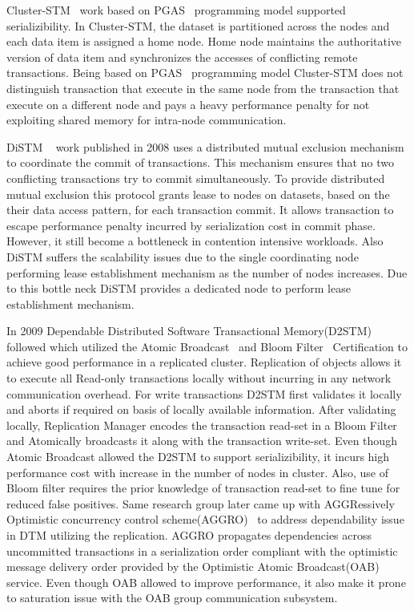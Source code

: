 \documentclass[12pt,english]{report}
\begin{document}
Cluster-STM~\cite{Bocchino:2008:STM:1345206.1345242} work based on PGAS~\cite{PGAS:Programmin:Model} programming model supported serializibility. In Cluster-STM, the dataset is partitioned across the nodes and each data item is assigned a home node. Home node maintains the authoritative version of data item and synchronizes the accesses of conflicting remote transactions. Being based on PGAS~\cite{PGAS:Programmin:Model} programming model Cluster-STM does not distinguish transaction that execute in the same node from the transaction that execute on a different node and pays a heavy performance penalty for not exploiting shared memory for intra-node communication.

DiSTM ~\cite{Kotselidis08distm:a} work published in 2008 uses a distributed mutual exclusion mechanism to coordinate the commit of transactions. This mechanism ensures that no two conflicting transactions try to commit simultaneously. To provide distributed mutual exclusion this protocol grants lease to nodes on datasets, based on the their data access pattern, for each transaction commit. It allows transaction to escape performance penalty incurred by serialization cost in commit phase. However, it still become a bottleneck in contention intensive workloads. Also DiSTM suffers the scalability issues due to the single coordinating node performing lease establishment mechanism as the number of nodes increases. Due to this bottle neck DiSTM provides a dedicated node to perform lease establishment mechanism.

In 2009 Dependable Distributed Software Transactional Memory(D2STM)~\cite{D2STM:5368778} followed which utilized the Atomic Broadcast~\cite{Defago:2004:TOB:1041680.1041682} and Bloom Filter~\cite{Bloom:1970:STH:362686.362692} Certification to achieve good performance in a replicated cluster. Replication of objects allows it to execute all Read-only transactions locally without incurring in any network communication overhead. For write transactions D2STM first validates it locally and aborts if required on basis of locally available information. After validating locally, Replication Manager encodes the transaction read-set in a Bloom Filter and Atomically broadcasts it along with the transaction write-set. Even though Atomic Broadcast allowed the D2STM to support serializibility, it incurs high performance cost with increase in the number of nodes in cluster. Also, use of Bloom filter requires the prior knowledge of transaction read-set to fine tune for reduced false positives. Same research group later came up with AGGRessively Optimistic concurrency control scheme(AGGRO)~\cite{AGGRO:5598236} to address dependability issue in DTM utilizing the replication. AGGRO propagates dependencies across uncommitted transactions in a serialization order compliant with the optimistic message delivery order provided by the Optimistic Atomic Broadcast(OAB)~\cite{OAB:Pedone200379} service. Even though OAB allowed to improve performance, it also make it prone to saturation issue with the OAB group communication subsystem.  
\end{document}
